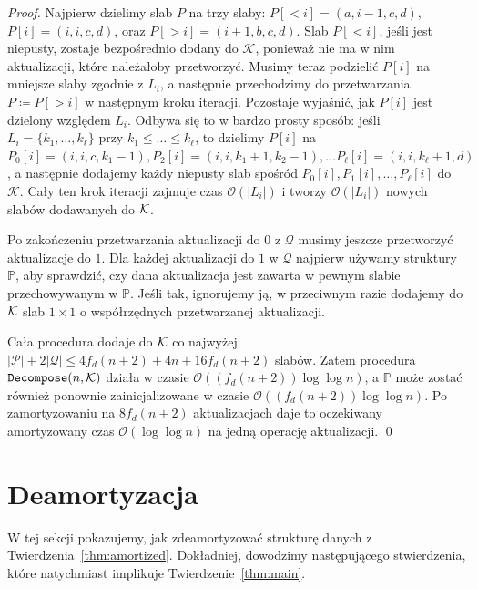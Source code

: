 \documentclass[runningheads]{llncs}
\newcommand{\Oh}{\mathcal{O}}
\renewcommand{\leq}{\leqslant}
\begin{document}
\begin{proof}
Najpierw dzielimy slab $P$ na trzy slaby:
$P[<i] = (a,i-1,c,d)$,
$P[i]=(i,i,c,d)$, oraz
$P[>i]= (i+1,b,c,d)$. Slab $P[<i]$, jeśli jest
niepusty, zostaje bezpośrednio dodany do $\mathcal{K}$, ponieważ
nie ma w nim aktualizacji, które należałoby przetworzyć. Musimy teraz
podzielić $P[i]$ na mniejsze slaby zgodnie z $L_i$, a następnie przechodzimy do
przetwarzania
$P\coloneqq P[>i]$ w następnym kroku iteracji. Pozostaje
wyjaśnić, jak $P[i]$ jest dzielony względem $L_i$. Odbywa się to
w bardzo prosty sposób: jeśli $L_i=\{ k_1,\ldots,k_\ell \}$ przy $k_1\leq \ldots\leq k_\ell$, to
dzielimy $P[i]$ na
$P_0[i]=(i,i,c,k_1-1), P_2[i]=(i,i,k_1+1,k_2-1),
\ldots P_{\ell}[i]=(i,i,k_\ell+1,d)$, a następnie dodajemy każdy niepusty
slab
spośród $P_0[i],P_1[i], \ldots, P_\ell[i]$ do $\mathcal{K}$.
Cały ten krok iteracji zajmuje czas $\Oh(|L_i|)$ i
tworzy $\Oh(|L_i|)$ nowych slabów dodawanych do $\cal K$.

Po zakończeniu przetwarzania aktualizacji do $0$ z $\mathcal{Q}$
musimy jeszcze przetworzyć aktualizacje do $1$. Dla
każdej aktualizacji do $1$ w $\mathcal{Q}$ najpierw używamy
struktury $\mathbb{P}$, aby sprawdzić, czy dana aktualizacja jest zawarta
w pewnym slabie przechowywanym w $\mathbb{P}$. Jeśli tak, ignorujemy ją,
w przeciwnym razie dodajemy do $\cal K$ slab $1 \times 1$ o
współrzędnych przetwarzanej aktualizacji.

Cała procedura dodaje do $\cal K$ co najwyżej
$|\mathcal{P}|+2|\mathcal{Q}| \leq 4 f_d(n+2)+4n + 16 f_d(n+2)$ slabów.
Zatem procedura $\mathtt{Decompose}(n,\cal K)$
działa w czasie $\Oh(( f_d (n+2))\log \log n)$, a $\mathbb{P}$
może zostać również ponownie zainicjalizowane w czasie $\Oh(( f_d (n+2))\log \log n)$.
Po zamortyzowaniu na $8 f_d(n+2)$ aktualizacjach daje to
oczekiwany amortyzowany czas $\Oh(\log \log n)$ na jedną operację aktualizacji.
\qed\end{proof}
 
\section{Deamortyzacja}
\label{sec:wcase}

W tej sekcji pokazujemy, jak zdeamortyzować strukturę danych
z
Twierdzenia~\ref{thm:amortized}. Dokładniej, dowodzimy następującego stwierdzenia, które natychmiast implikuje Twierdzenie~\ref{thm:main}.
\end{document}
